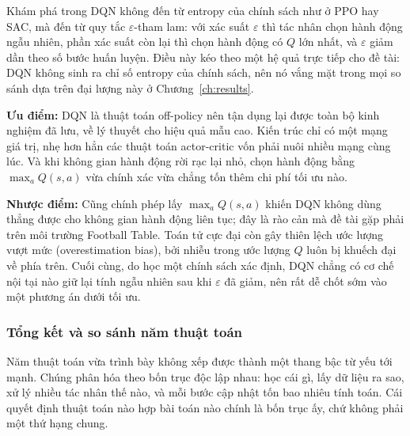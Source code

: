 \indent Khám phá trong DQN không đến từ entropy của chính sách như ở PPO hay SAC, mà đến
từ quy tắc $\varepsilon$-tham lam: với xác suất $\varepsilon$ thì tác nhân chọn hành động
ngẫu nhiên, phần xác suất còn lại thì chọn hành động có $Q$ lớn nhất, và $\varepsilon$
giảm dần theo số bước huấn luyện. Điều này kéo theo một hệ quả trực tiếp cho đề tài: DQN
không sinh ra chỉ số entropy của chính sách, nên nó vắng mặt trong mọi so sánh dựa trên
đại lượng này ở Chương~\ref{ch:results}.

\indent \textbf{Ưu điểm:} DQN là thuật toán off-policy nên tận dụng lại được toàn bộ kinh
nghiệm đã lưu, về lý thuyết cho hiệu quả mẫu cao. Kiến trúc chỉ có một mạng giá trị, nhẹ
hơn hẳn các thuật toán actor-critic vốn phải nuôi nhiều mạng cùng lúc. Và khi không gian
hành động rời rạc lại nhỏ, chọn hành động bằng $\max_a Q(s,a)$ vừa chính xác vừa chẳng tốn
thêm chi phí tối ưu nào.

\indent \textbf{Nhược điểm:} Cũng chính phép lấy $\max_a Q(s,a)$ khiến DQN không dùng
thẳng được cho không gian hành động liên tục; đây là rào cản mà đề tài gặp phải trên môi
trường Football Table. Toán tử cực đại còn gây thiên lệch ước lượng vượt mức
(overestimation bias), bởi nhiễu trong ước lượng $Q$ luôn bị khuếch đại về phía trên. Cuối
cùng, do học một chính sách xác định, DQN chẳng có cơ chế nội tại nào giữ lại tính ngẫu
nhiên sau khi $\varepsilon$ đã giảm, nên rất dễ chốt sớm vào một phương án dưới tối ưu.

\subsubsection{Tổng kết và so sánh năm thuật toán}
\indent Năm thuật toán vừa trình bày không xếp được thành một thang bậc từ yếu tới mạnh.
Chúng phân hóa theo bốn trục độc lập nhau: học cái gì, lấy dữ
liệu ra sao, xử lý nhiều tác nhân thế nào, và mỗi bước cập nhật tốn bao nhiêu tính toán. Cái quyết định thuật
toán nào hợp bài toán nào chính là bốn trục ấy, chứ không phải một thứ hạng chung.


